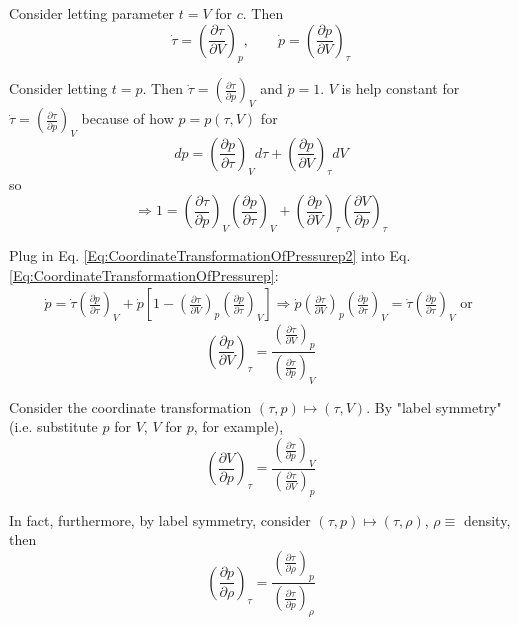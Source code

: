 \documentclass[twoside,landscape,10pt]{amsart}
\theoremstyle{plain}
\theoremstyle{definition}
\theoremstyle{remark}
\theoremstyle{remark}
\begin{document}
\begin{multicols*}{2}
Consider letting parameter $t=V$ for $c$. Then
\[
\dot{\tau} = \left( \frac{ \partial \tau }{ \partial V } \right)_p, \qquad \dot{p} = \left( \frac{ \partial p }{ \partial V} \right)_{\tau}
\]

Consider letting $t=p$. Then $\dot{\tau} = \left( \frac{ \partial \tau}{ \partial p} \right)_V$ and $\dot{p} = 1$. $V$ is help constant for $\dot{\tau} = \left( \frac{ \partial \tau}{ \partial p} \right)_V$ because of how $p = p(\tau, V)$ for 
\[
dp = \left(\frac{ \partial p}{ \partial \tau} \right)_V d\tau + \left( \frac{ \partial p }{ \partial V} \right)_{\tau} dV
\]
so
\begin{equation}\label{Eq:CoordinateTransformationOfPressurep2}
\Longrightarrow 1 = \left( \frac{ \partial \tau }{ \partial p } \right)_V \left( \frac{ \partial p }{ \partial \tau } \right)_V + \left( \frac{ \partial p }{ \partial V } \right)_{\tau} \left( \frac{ \partial V }{ \partial p } \right)_{\tau}
\end{equation}

Plug in Eq. \ref{Eq:CoordinateTransformationOfPressurep2} into Eq. \ref{Eq:CoordinateTransformationOfPressurep}:
\[
\begin{gathered}
\dot{p} = \dot{\tau} \left( \frac{ \partial p}{ \partial \tau} \right)_V + \dot{p} \left[ 1 - \left( \frac{ \partial \tau}{ \partial V} \right)_p \left( \frac{\partial p}{ \partial \tau} \right)_V \right] \Longrightarrow \dot{p} \left( \frac{ \partial \tau }{ \partial V } \right)_p \left( \frac{ \partial p }{ \partial \tau } \right)_V = \dot{\tau} \left( \frac{ \partial p }{ \partial \tau } \right)_V \text{ or }
\end{gathered}
\]
\begin{equation}
\boxed{ \left( \frac{ \partial p }{ \partial V} \right)_{\tau} = \frac{\left( \frac{ \partial \tau }{ \partial V } \right)_p }{ \left( \frac{ \partial \tau }{ \partial p } \right)_V} }
\end{equation}

Consider the coordinate transformation $(\tau, p) \mapsto (\tau, V)$. By "label symmetry" (i.e. substitute $p$ for $V$, $V$ for $p$, for example),
\begin{equation}
\boxed{ \left( \frac{\partial V}{ \partial p } \right)_{\tau} = \frac{ \left( \frac{ \partial \tau }{ \partial p } \right)_V}{ \left( \frac{ \partial \tau }{ \partial V } \right)_p } }
\end{equation}

In fact, furthermore, by label symmetry, consider $(\tau, p) \mapsto (\tau, \rho)$, $\rho \equiv $ density, then
\begin{equation}
\boxed{ \left( \frac{\partial p}{ \partial \rho } \right)_{\tau} = \frac{ \left( \frac{ \partial \tau }{ \partial \rho } \right)_p}{ \left( \frac{ \partial \tau }{ \partial p } \right)_{\rho} } }
\end{equation}


\end{multicols*}
\end{document}

